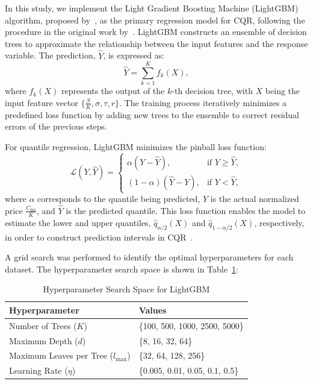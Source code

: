 \documentclass{article}
\theoremstyle{definition}
\begin{document}
In this study, we implement the Light Gradient Boosting Machine (LightGBM) algorithm, proposed by~\cite{ke2017}, as the primary regression model for CQR, following the procedure in the original work by~\cite{bastos}. LightGBM constructs an ensemble of decision trees to approximate the relationship between the input features and the response variable. The prediction, $\hat{Y}$, is expressed as:
\begin{equation}
\hat{Y} = \sum_{k=1}^K f_k(X),
\end{equation}
where $f_k(X)$ represents the output of the $k$-th decision tree, with $X$ being the input feature vector $\{\frac{S}{K}, \sigma, \tau, r\}$. The training process iteratively minimizes a predefined loss function by adding new trees to the ensemble to correct residual errors of the previous steps.

For quantile regression, LightGBM minimizes the pinball loss function:
\begin{equation}
\mathcal{L}(Y, \hat{Y}) =
\begin{cases}
\alpha \left(Y - \hat{Y}\right), & \text{if } Y \geq \hat{Y}, \\
(1-\alpha) \left(\hat{Y} - Y\right), & \text{if } Y < \hat{Y},
\end{cases}
\end{equation}
where $\alpha$ corresponds to the quantile being predicted, $Y$ is the actual normalized price $\frac{C_{\text{BS}}}{K}$, and $\hat{Y}$ is the predicted quantile. This loss function enables the model to estimate the lower and upper quantiles, $\hat{q}_{\alpha/2}(X)$ and $\hat{q}_{1-\alpha/2}(X)$, respectively, in order to construct prediction intervals in CQR~\cite{cqr}.

A grid search was performed to identify the optimal hyperparameters for each dataset. The hyperparameter search space is shown in Table~\ref{tab:hyperparameters}:

\begin{table}[]
\centering
\caption{Hyperparameter Search Space for LightGBM}
\label{tab:hyperparameters}
\begin{tabular}{@{}ll@{}}
\toprule
\textbf{Hyperparameter}         & \textbf{Values}            \\ \midrule
Number of Trees ($K$)         & \{100, 500, 1000, 2500, 5000\} \\
Maximum Depth ($d$)           & \{8, 16, 32, 64\}          \\
Maximum Leaves per Tree ($l_{\max}$) & \{32, 64, 128, 256\}   \\
Learning Rate ($\eta$)        & \{0.005, 0.01, 0.05, 0.1, 0.5\} \\ \bottomrule
\end{tabular}
\end{table}
\end{document}
